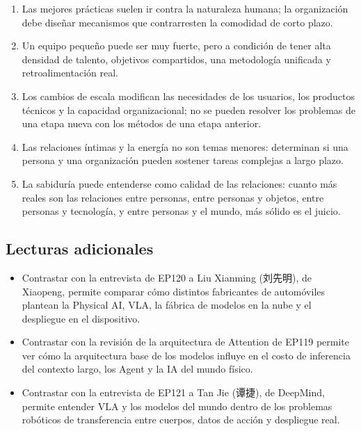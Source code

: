 \documentclass[a4paper]{article}
\begin{document}
\begin{enumerate}
\item Las mejores prácticas suelen ir contra la naturaleza humana; la organización debe diseñar mecanismos que contrarresten la comodidad de corto plazo.
\item Un equipo pequeño puede ser muy fuerte, pero a condición de tener alta densidad de talento, objetivos compartidos, una metodología unificada y retroalimentación real.
\item Los cambios de escala modifican las necesidades de los usuarios, los productos técnicos y la capacidad organizacional; no se pueden resolver los problemas de una etapa nueva con los métodos de una etapa anterior.
\item Las relaciones íntimas y la energía no son temas menores: determinan si una persona y una organización pueden sostener tareas complejas a largo plazo.
\item La sabiduría puede entenderse como calidad de las relaciones: cuanto más reales son las relaciones entre personas, entre personas y objetos, entre personas y tecnología, y entre personas y el mundo, más sólido es el juicio.
\end{enumerate}

\subsection{Lecturas adicionales}

\begin{itemize}
\item Contrastar con la entrevista de EP120 a Liu Xianming (刘先明), de Xiaopeng, permite comparar cómo distintos fabricantes de automóviles plantean la Physical AI, VLA, la fábrica de modelos en la nube y el despliegue en el dispositivo.
\item Contrastar con la revisión de la arquitectura de Attention de EP119 permite ver cómo la arquitectura base de los modelos influye en el costo de inferencia del contexto largo, los Agent y la IA del mundo físico.
\item Contrastar con la entrevista de EP121 a Tan Jie (谭捷), de DeepMind, permite entender VLA y los modelos del mundo dentro de los problemas robóticos de transferencia entre cuerpos, datos de acción y despliegue real.
\end{itemize}
\end{document}
